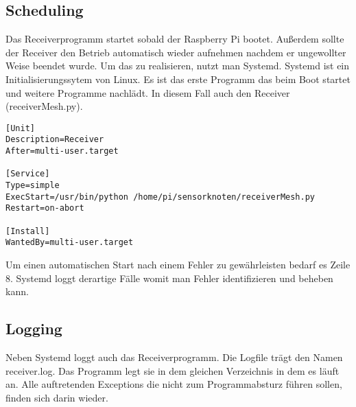 \subsection{Scheduling}
\label{sec:scheduling}
Das Receiverprogramm startet sobald der Raspberry Pi bootet. Außerdem sollte der Receiver den Betrieb automatisch wieder aufnehmen nachdem er ungewollter Weise beendet wurde. 
Um das zu realisieren, nutzt man Systemd. Systemd ist ein Initialisierungssytem von Linux. Es ist das erste Programm das beim Boot startet und weitere Programme nachlädt. In diesem Fall auch den Receiver (receiverMesh.py).
\lstset{language=bash, numbers=left, breaklines=true}
\begin{lstlisting}
[Unit]
Description=Receiver
After=multi-user.target

[Service]
Type=simple
ExecStart=/usr/bin/python /home/pi/sensorknoten/receiverMesh.py
Restart=on-abort

[Install]
WantedBy=multi-user.target
\end{lstlisting}
Um einen automatischen Start nach einem Fehler zu gewährleisten bedarf es Zeile 8. Systemd loggt derartige Fälle womit man Fehler identifizieren und beheben kann.

\subsection{Logging}
\label{sec:logging}
Neben Systemd loggt auch das Receiverprogramm. Die Logfile trägt den Namen receiver.log. Das Programm legt sie in dem gleichen Verzeichnis in dem es läuft an. Alle auftretenden Exceptions die nicht zum Programmabsturz führen sollen, finden sich darin wieder.
